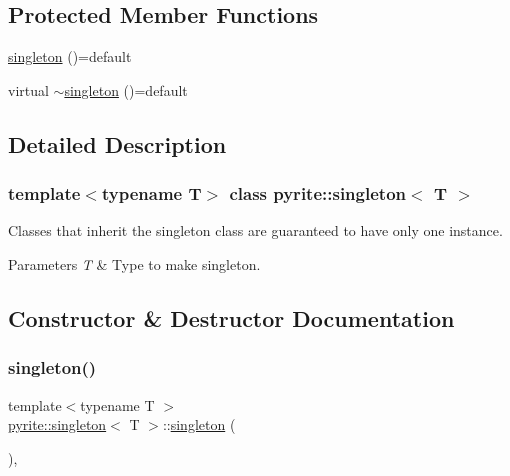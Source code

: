 \subsection*{Protected Member Functions}
\begin{DoxyCompactItemize}
\item 
\mbox{\hyperlink{classpyrite_1_1singleton_afda9f6dd559bbb33d00d2a9ed4957e08}{singleton}} ()=default
\item 
virtual \mbox{\hyperlink{classpyrite_1_1singleton_a7255eef299d5121b3a57d4c808776847}{$\sim$singleton}} ()=default
\end{DoxyCompactItemize}


\subsection{Detailed Description}
\subsubsection*{template$<$typename T$>$\newline
class pyrite\+::singleton$<$ T $>$}

Classes that inherit the singleton class are guaranteed to have only one instance. 
\begin{DoxyParams}{Parameters}
{\em T} & Type to make singleton. \\
\hline
\end{DoxyParams}


\subsection{Constructor \& Destructor Documentation}
\mbox{\label{classpyrite_1_1singleton_afda9f6dd559bbb33d00d2a9ed4957e08}} 
\subsubsection{\texorpdfstring{singleton()}{singleton()}}
{\footnotesize\ttfamily template$<$typename T $>$ \\
\mbox{\hyperlink{classpyrite_1_1singleton}{pyrite\+::singleton}}$<$ T $>$\+::\mbox{\hyperlink{classpyrite_1_1singleton}{singleton}} (\begin{DoxyParamCaption}{ }\end{DoxyParamCaption})\hspace{0.3cm}{\ttfamily [protected]}, {\ttfamily [default]}}

